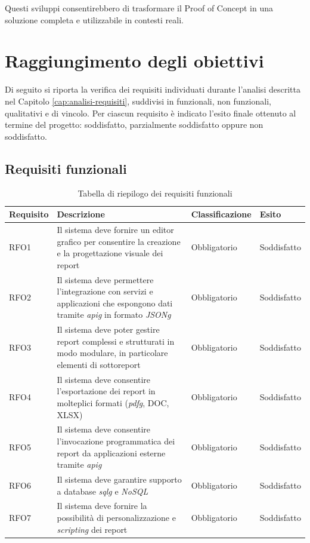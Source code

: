 Questi sviluppi consentirebbero di trasformare il Proof of Concept in una soluzione completa e utilizzabile in contesti reali.

\section{Raggiungimento degli obiettivi}
Di seguito si riporta la verifica dei requisiti individuati durante l'analisi descritta nel Capitolo \ref{cap:analisi-requisiti}, suddivisi in funzionali, non funzionali, qualitativi e di vincolo. Per ciascun requisito è indicato l'esito finale ottenuto al termine del progetto: soddisfatto, parzialmente soddisfatto oppure non soddisfatto.

\subsection{Requisiti funzionali}
\begin{table}[H]%
            \caption{Tabella di riepilogo dei requisiti funzionali}
            \label{tab:requisiti-funzionali-conclusioni}
            \begin{tabularx}{\textwidth}{|lXll|}
            \hline\hline
            \rowcolor{gray!40}
            \textbf{Requisito} & \textbf{Descrizione} & \textbf{Classificazione} & \textbf{Esito}\\
            \hline
            RFO1    & Il sistema deve fornire un editor grafico per consentire la creazione e la progettazione visuale dei report & Obbligatorio & Soddisfatto\\
            \hline
            RFO2    & Il sistema deve permettere l'integrazione con servizi e applicazioni che espongono dati tramite \emph{\gls{apig}} in formato \emph{\gls{JSONg}} & Obbligatorio & Soddisfatto\\
            \hline
            RFO3    & Il sistema deve poter gestire report complessi e strutturati in modo modulare, in particolare elementi di sottoreport & Obbligatorio & Soddisfatto\\
            \hline
            RFO4    & Il sistema deve consentire l'esportazione dei report in molteplici formati (\emph{\gls{pdfg}}, DOC, XLSX) & Obbligatorio & Soddisfatto\\
            \hline
            RFO5    & Il sistema deve consentire l'invocazione programmatica dei report da applicazioni esterne tramite \emph{\gls{apig}} & Obbligatorio & Soddisfatto\\
            \hline
            RFO6    & Il sistema deve garantire supporto a database \emph{\gls{sqlg}} e \emph{NoSQL} & Obbligatorio & Soddisfatto\\
            \hline
            RFO7    & Il sistema deve fornire la possibilità di personalizzazione e \emph{scripting} dei report & Obbligatorio & Soddisfatto\\
            \hline
            \end{tabularx}
        \end{table}%

